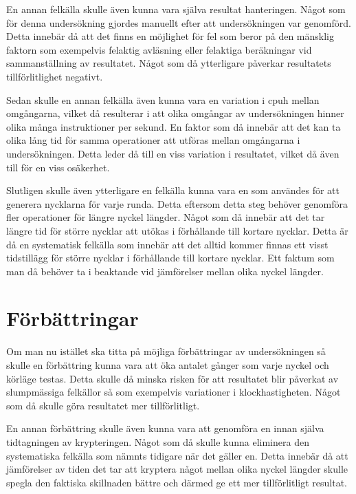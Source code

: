 En annan felkälla skulle även kunna vara själva resultat hanteringen. Något som för denna undersökning gjordes manuellt efter att undersökningen var genomförd. Detta innebär då att
det finns en möjlighet för fel som beror på den mänsklig faktorn som exempelvis felaktig avläsning eller felaktiga beräkningar vid sammanställning av resultatet. Något som då ytterligare
påverkar resultatets tillförlitlighet negativt. %

Sedan skulle en annan felkälla även kunna vara en variation i \gls{cpuh} mellan omgångarna, vilket då resulterar i att olika omgångar av undersökningen hinner olika många instruktioner
per sekund. En faktor som då innebär att det kan ta olika lång tid för samma operationer att utföras mellan omgångarna i undersökningen. Detta leder då till en viss variation i resultatet,
vilket då även till för en viss osäkerhet. %

Slutligen skulle även ytterligare en felkälla kunna vara en som användes för att generera nycklarna för varje runda. Detta eftersom detta steg behöver genomföra fler operationer för längre nyckel längder.
Något som då innebär att det tar längre tid för större nycklar att utökas i förhållande till kortare nycklar. Detta är då en systematisk felkälla som innebär att det alltid kommer
finnas ett visst tidstillägg för större nycklar i förhållande till kortare nycklar. Ett faktum som man då behöver ta i beaktande vid jämförelser mellan olika nyckel längder. %

\section{Förbättringar} %
\label{sec:improvements}
Om man nu istället ska titta på möjliga förbättringar av undersökningen så skulle en förbättring kunna vara att öka antalet gånger som varje nyckel och körläge testas. Detta skulle då
minska risken för att resultatet blir påverkat av slumpmässiga felkällor så som exempelvis variationer i klockhastigheten. Något som då skulle göra resultatet mer tillförlitligt. %

En annan förbättring skulle även kunna vara att genomföra en innan själva tidtagningen av krypteringen. Något som då skulle kunna eliminera den systematiska
felkälla som nämnts tidigare när det gäller en. Detta innebär då att jämförelser av tiden det tar att kryptera något mellan olika nyckel längder skulle spegla
den faktiska skillnaden bättre och därmed ge ett mer tillförlitligt resultat. %

